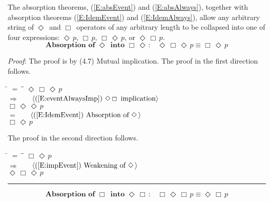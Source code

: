 \documentclass[12pt, fleqn, leqno]{article}
\newcommand{\lgap}{2pt}                             %
\newcommand{\mymathindent}{24pt}                    %
\newcommand{\impl}{\ensuremath{\Rightarrow}}        %
\newcommand{\Event}{\Diamond\,}
\newcommand{\Always}{\Box\,}
\newcommand{\myqed}{\rule[-.23ex]{1.2ex}{2.0ex}}
\newcommand{\myqedtab}{\hspace{384pt}}              %
\newcommand{\Gll} {\langle}                         %
\newcommand{\Ggg} {\rangle}                         %
\newcommand{\Hint}[1]     {\ \ \ $\Gll              \mbox{#1} \Ggg$ }   %
\begin{document}
The absorption theorems, (\ref{E:absEvent}) and (\ref{E:absAlways}), together with absorption theorems
(\ref{E:IdemEvent}) and (\ref{E:IdemAlways}), allow any arbitrary string of $\Event$ and $\Always$ operators
of any arbitrary length to be collapsed into one of four expressions: \;$\Event p$, \;$\Always p$,
\;$\Always\Event p$, or \;$\Event\Always p$.
\begin{equation}\label{E:absEvent}
\textbf{Absorption of $\Event$ into $\Always\Event$:}\quad \Event\Always\Event p \equiv \Always\Event p
\end{equation}

\emph{Proof}: The proof is by (4.7) Mutual implication.
The proof in the first direction follows.
\begin{tabbing}
\hspace{\mymathindent} \= $= \;$ \= \myqedtab \= \kill
  \> \>   $\Event\Always\Event p$\\[\lgap]
  \> $\impl$  \>  \Hint{(\ref{E:eventAlwaysImp}) $\Event\Always$ implication}\\[\lgap]
  \> \>   $\Always\Event\Event p$\\[\lgap]
  \> $=$  \>  \Hint{(\ref{E:IdemEvent}) Absorption of $\Event$}\\[\lgap]
  \> \>   $\Always\Event p$
\end{tabbing}
The proof in the second direction follows.
\begin{tabbing}
\hspace{\mymathindent} \= $= \;$ \= \myqedtab \= \kill
  \> \>   $\Always\Event p$\\[\lgap]
  \> $\impl$  \>  \Hint{(\ref{E:impEvent}) Weakening of $\Event$}\\[\lgap]
  \> \>   $\Event\Always\Event p$ \quad \myqed
\end{tabbing}
\begin{equation}\label{E:absAlways}
\textbf{Absorption of $\Always$ into $\Event\Always$:}\quad \Always\Event\Always p \equiv \Event\Always p
\end{equation}
\end{document}
